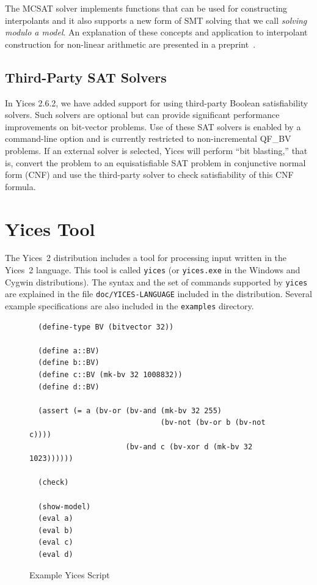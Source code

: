 \documentclass[11pt,twoside,fleqn,openright,titlepage]{cslreport}
\begin{document}
The MCSAT solver implements functions that can be used for
constructing interpolants and it also supports a new form of SMT
solving that we call {\em solving modulo a model\/}. An explanation
of these concepts and application to interpolant construction for
non-linear arithmetic are presented in a preprint~\cite{jovanovic2021interpolation}.

\section{Third-Party SAT Solvers}

In Yices 2.6.2, we have added support for using third-party Boolean
satisfiability solvers. Such solvers are optional but can provide
significant performance improvements on bit-vector problems. Use of
these SAT solvers is enabled by a command-line option and is currently
restricted to non-incremental QF\_BV problems. If an external solver
is selected, Yices will perform ``bit blasting,'' that is, convert the
problem to an equisatisfiable SAT problem in conjunctive normal form
(CNF) and use the third-party solver to check satisfiability of this
CNF formula.




\chapter{Yices Tool}
\label{yices-shell}

The Yices~2 distribution includes  a tool for processing input written
in  the Yices~2  language.  This  tool is  called  \texttt{yices} (or
\texttt{yices.exe}  in  the Windows  and  Cygwin distributions).   The
syntax  and  the  set  of  commands supported  by  \texttt{yices}  are
explained  in  the file  \texttt{doc/YICES-LANGUAGE}  included in  the
distribution. Several example specifications  are also included in the
\texttt{examples} directory.

\begin{figure}[ht]
\begin{footnotesize}
\begin{verbatim}
  (define-type BV (bitvector 32))

  (define a::BV)
  (define b::BV)
  (define c::BV (mk-bv 32 1008832))
  (define d::BV)

  (assert (= a (bv-or (bv-and (mk-bv 32 255)
                              (bv-not (bv-or b (bv-not c))))
                      (bv-and c (bv-xor d (mk-bv 32 1023))))))

  (check)

  (show-model)
  (eval a)
  (eval b)
  (eval c)
  (eval d)
\end{verbatim}
\end{footnotesize}
\caption{Example Yices Script}
\label{example:bv_test2}
\end{figure}
\end{document}
